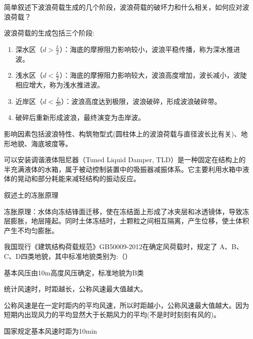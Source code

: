 \documentclass[12pt, a4paper, oneside, UTF8]{ctexbook}
\begin{document}
\begin{example}
    简单叙述下波浪荷载生成的几个阶段，波浪荷载的破坏力和什么相关，如何应对波浪荷载？

    波浪荷载的生成包括三个阶段:
    \begin{enumerate}
        \item 深水区（$d > \frac{L}{2}$）：海底的摩擦阻力影响较小，波浪平稳传播，称为深水推进波。
        \item 浅水区（$d < \frac{L}{2}$）：海底的摩擦阻力影响较大，波浪高度增加，波长减小，波陡相应增大，称为浅水推进波。
        \item 近岸区（$d < \frac{L}{20}$）：波浪高度达到极限，波浪破碎，形成波浪破碎带。
        \item 破碎后重新形成波浪，最终演变为击岸波。
    \end{enumerate}

    影响因素包括波浪特性、构筑物型式(圆柱体上的波浪荷载与直径波长比有关)、地形地貌、海底坡度等。    

    可以安装调谐液体阻尼器（Tuned Liquid Damper, TLD）是一种固定在结构上的半充满液体的水箱，属于被动控制装置中的吸振器减振体系。它主要利用水箱中液体的晃动和部分耗能来减轻结构的振动反应。
\end{example}

\begin{example}
    叙述土的冻胀原理

    冻胀原理：水体向冻结锋面迁移，使在冻结面上形成了冰夹层和冰透镜体，导致冻层膨胀，地层隆起。同时土体冻结时，土颗粒之间相互隔离，产生位移，使土体积产生不均匀膨胀。

\end{example}

\begin{example}
    我国现行《建筑结构荷载规范》GB50009-2012在确定风荷载时，规定了
A、B、C、D四类地貌，其中标准地貌类别为:（）

基本风压由10m高度风压确定，标准地貌为B类
\end{example}

\begin{example}
    统计风速时，时距越长，公称风速最大值越大。

    公称风速是在一定时距内的平均风速，所以时距越小，公称风速最大值越大。因为短期内出现风力的平均显然大于长期风力的平均(不是时时刻刻有风的)。
\end{example}

\begin{remark}
    国家规定基本风速时距为10min
\end{remark}
\end{document}
